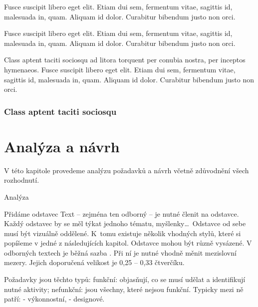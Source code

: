 \begin{note}
Fusce suscipit libero eget elit. Etiam dui sem, fermentum vitae, sagittis id, malesuada in, quam. Aliquam id dolor. Curabitur bibendum justo non orci.
\end{note}

\begin{remark}
Fusce suscipit libero eget elit. Etiam dui sem, fermentum vitae, sagittis id, malesuada in, quam. Aliquam id dolor. Curabitur bibendum justo non orci.
\end{remark}

\begin{lemma}
Class aptent taciti sociosqu ad litora torquent per conubia nostra, per inceptos hymenaeos. Fusce suscipit libero eget elit. Etiam dui sem, fermentum vitae, sagittis id, malesuada in, quam. Aliquam id dolor. Curabitur bibendum justo non orci.
\end{lemma}

\lipsum[1-2]

\subsection{Class aptent taciti sociosqu}

\lipsum[4-5]


\chapter{Analýza a návrh}

\begin{chapterabstract}
    V této kapitole provedeme analýzu požadavků a návrh včetně zdůvodnění všech rozhodnutí.
\end{chapterabstract}

Analýza

Přidáme odstavec Text -- zejména ten odborný -- je nutné členit na odstavce. Každý odstavec by se měl týkat jednoho tématu, myšlenky\dots{}\ Odstavce od sebe musí být vizuálně oddělené. K~tomu existuje několik vhodných stylů, které si popíšeme v jedné z následujících kapitol. Odstavce mohou být různě vysázené. V odborných textech je běžná sazba . Při ní je nutné vhodně měnit mezislovní mezery. Jejich doporučená velikost je 0,25 -- 0,33 čtverčíku.

Požadavky jsou těchto typů:
funkční: objasňují, co se musí udělat a identifikují nutné aktivity;
nefunkční: jsou všechny, které nejsou funkční. Typicky mezi ně patří: 
   - výkonnostní,
   - designové.

